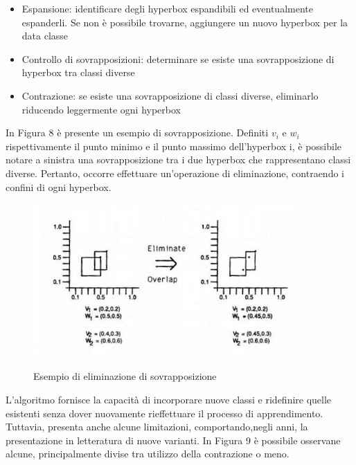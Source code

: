 \documentclass[11pt]{article}
\begin{document}
\begin{itemize}
\item Espansione: identificare degli hyperbox espandibili ed eventualmente espanderli. Se non è possibile trovarne, aggiungere un nuovo hyperbox per la data classe
\item Controllo di sovrapposizioni: determinare se esiste una sovrapposizione di hyperbox tra classi diverse
\item Contrazione: se esiste una sovrapposizione di classi diverse, eliminarlo riducendo leggermente ogni hyperbox
\end{itemize}

In Figura 8 è presente un esempio di sovrapposizione. Definiti $v_i$ e $w_i$ rispettivamente il punto minimo e il punto massimo dell'hyperbox i, è possibile notare a sinistra una sovrapposizione tra i due hyperbox che rappresentano classi diverse. Pertanto, occorre effettuare un'operazione di eliminazione, contraendo i confini di ogni hyperbox. 

\begin{figure}[h!]
\begin{center}
  \includegraphics[width=10cm]{Immagini/elimination_overlap.png}\\
  \caption{Esempio di eliminazione di sovrapposizione}
\end{center}
\end{figure}


L'algoritmo fornisce la capacità di incorporare nuove classi e ridefinire quelle esistenti senza dover nuovamente rieffettuare il processo di apprendimento. Tuttavia, presenta anche alcune limitazioni, comportando,negli anni, la presentazione in letteratura di nuove varianti\cite{fmmnn_variants}. In Figura 9 è possibile osservane alcune, principalmente divise tra utilizzo della contrazione o meno. 
\end{document}
